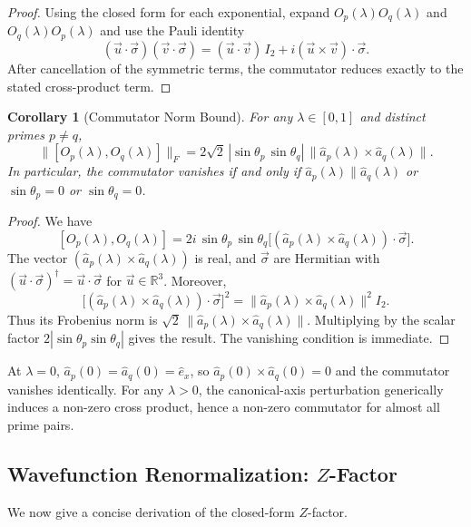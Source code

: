 \documentclass[11pt]{article}
\newtheorem{corollary}[theorem]{Corollary}
\theoremstyle{remark}
\begin{document}
\begin{proof}
Using the closed form for each exponential, expand $O_p(\lambda)O_q(\lambda)$
and $O_q(\lambda)O_p(\lambda)$ and use the Pauli identity
\[
  (\vec{u}\cdot\vec{\sigma})(\vec{v}\cdot\vec{\sigma})
  = (\vec{u}\cdot\vec{v})\,I_2
    + i(\vec{u}\times\vec{v})\cdot\vec{\sigma}.
\]
After cancellation of the symmetric terms, the commutator reduces exactly to
the stated cross-product term.
\end{proof}

\begin{corollary}[Commutator Norm Bound]
For any $\lambda\in[0,1]$ and distinct primes $p\ne q$,
\[
  \|[O_p(\lambda),O_q(\lambda)]\|_F
  = 2\sqrt{2}\,|\sin\theta_p\,\sin\theta_q|\,
    \|\hat{a}_p(\lambda)\times\hat{a}_q(\lambda)\|.
\]
In particular, the commutator vanishes if and only if
$\hat{a}_p(\lambda)\parallel\hat{a}_q(\lambda)$ or $\sin\theta_p=0$
or $\sin\theta_q=0$.
\end{corollary}

\begin{proof}
We have
\[
  [O_p(\lambda),O_q(\lambda)]
  = 2i\,\sin\theta_p\,\sin\theta_q
    \bigl[(\hat{a}_p(\lambda)\times\hat{a}_q(\lambda))\cdot\vec{\sigma}\bigr].
\]
The vector $(\hat{a}_p(\lambda)\times\hat{a}_q(\lambda))$ is real, and
$\vec{\sigma}$ are Hermitian with $(\vec{u}\cdot\vec{\sigma})^\dagger
=\vec{u}\cdot\vec{\sigma}$ for $\vec{u}\in\mathbb{R}^3$. Moreover,
\[
  \bigl[(\hat{a}_p(\lambda)\times\hat{a}_q(\lambda))
    \cdot\vec{\sigma}\bigr]^2
  = \|\hat{a}_p(\lambda)\times\hat{a}_q(\lambda)\|^2 I_2.
\]
Thus its Frobenius norm is
$\sqrt{2}\,\|\hat{a}_p(\lambda)\times\hat{a}_q(\lambda)\|$. Multiplying by
the scalar factor $2|\sin\theta_p\sin\theta_q|$ gives the result.
The vanishing condition is immediate.
\end{proof}

At $\lambda=0$, $\hat{a}_p(0)=\hat{a}_q(0)=\hat{e}_x$, so
$\hat{a}_p(0)\times\hat{a}_q(0)=0$ and the commutator vanishes identically.
For any $\lambda>0$, the canonical-axis perturbation generically induces a
non-zero cross product, hence a non-zero commutator for almost all prime
pairs.

\subsection{Wavefunction Renormalization: $Z$-Factor}

We now give a concise derivation of the closed-form $Z$-factor.
\end{document}
